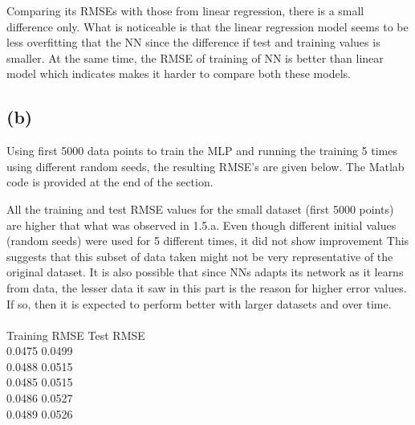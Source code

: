 \documentclass[english]{article}
\begin{document}
Comparing its RMSEs with those from linear regression, there is a small difference only. What is noticeable is that the linear regression model seems to be less overfitting that the NN since the difference if test and training values is smaller. At the same time, the RMSE of training of NN is better than linear model which indicates makes it harder to compare both these models. 

\subsection*{(b)}

Using first 5000 data points to train the MLP and running the training 5 times using different random seeds, the resulting RMSE's are given below. The Matlab code is provided at the end of the section.

All the training and test RMSE values for the small dataset (first 5000 points) are higher that what was 
observed in 1.5.a. Even though different initial values (random seeds) were used for 5 different times, it did not show improvement  This suggests that this subset of data taken might not be very representative of the original dataset. It is also possible that since NNs adapts its network as it learns from data, the lesser data it saw in this part is the reason for higher error values. If so, then it is expected to perform better with larger datasets and over time.
\\
\\
Training RMSE		Test RMSE
\\
0.0475 \hspace{2cm}0.0499
\\
0.0488 \hspace{2cm}0.0515
\\
0.0485 \hspace{2cm}0.0515
\\
0.0486 \hspace{2cm}0.0527
\\
0.0489 \hspace{2cm}0.0526

\end{document}
